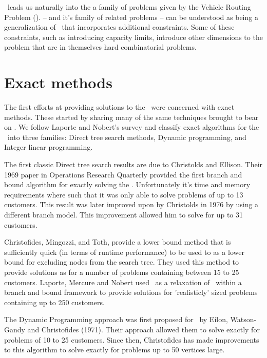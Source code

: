\MTSP\ leads us naturally into the a family of problems given by the Vehicle Routing Problem (\VRP). \VRP -- and it's family of related problems -- can be understood as being a generalization of \MTSP\ that incorporates additional constraints. Some of these constraints, such as introducing capacity limits, introduce other dimensions to the problem that are in themselves hard combinatorial problems.

\section{Exact methods}
\label{sec:em}

The first efforts at providing solutions to the \VRP\ were concerned with exact methods. These started by sharing many of the same techniques brought to bear on \TSP. We follow Laporte and Nobert's survey \cite{LANO:87} and classify exact algorithms for the \VRP\ into three families: Direct tree search methods, Dynamic programming, and Integer linear programming.

The first classic Direct tree search results are due to Christolds and Ellison. Their 1969 paper in Operations Research Quarterly provided the first branch and bound algorithm for exactly solving the \VRP \cite{CE:1969}. Unfortunately it's time and memory requirements where such that it was only able to solve problems of up to 13 customers. This result was later improved upon by Christolds in 1976 by using a different branch model. This improvement allowed him to solve for up to 31 customers. 

Christofides, Mingozzi, and Toth, \cite{CMT:1981} provide a lower bound method that is sufficiently quick (in terms of runtime performance) to be used to as a lower bound for excluding nodes from the search tree. They used this method to provide solutions as for a number of problems containing between 15 to 25 customers. Laporte, Mercure and Nobert \cite{LMN:1986} used \MTSP\ as a relaxation of \VRP\ within a branch and bound framework to provide solutions for 'realisticly' sized problems containing up to 250 customers.  

The Dynamic Programming approach was first proposed for \VRP\ by Eilon, Watson-Gandy and Christofides (1971). Their approach allowed them to solve exactly for problems of 10 to 25 customers. Since then, Christofides has made improvements to this algorithm to solve exactly for problems up to 50 vertices large.

